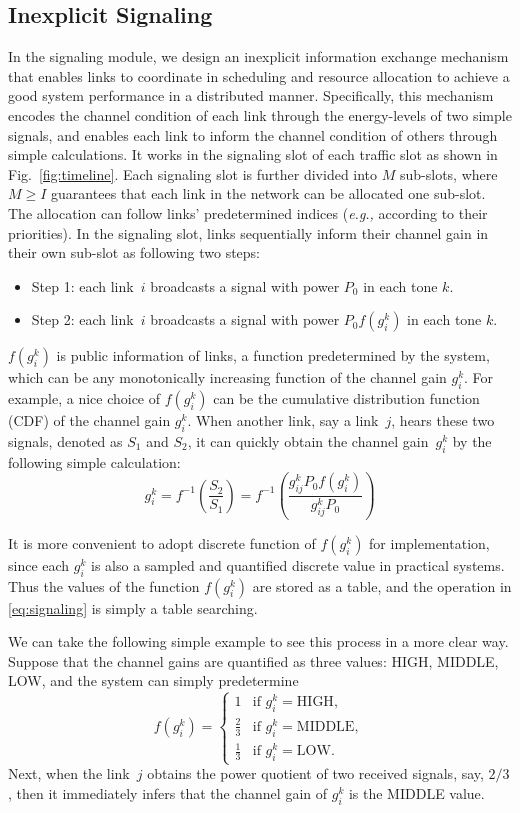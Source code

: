\documentclass[conference]{IEEEtran}
\newcommand{\eg}{\emph{e.g., }}
\begin{document}
\subsection{Inexplicit Signaling}
\label{sec:signaling}
In the signaling module, we design an inexplicit information exchange mechanism that enables links to coordinate in scheduling and resource allocation to achieve a good system performance in a distributed manner.
Specifically, this mechanism encodes the channel condition of each link through the energy-levels of two simple signals, and enables each link to inform the channel condition of others through simple calculations. It works in the signaling slot of each traffic slot as shown in Fig.~\ref{fig:timeline}. Each signaling slot is further divided into $M$ sub-slots, where $M\ge I$ guarantees that each link in the network can be allocated one sub-slot. The allocation can follow links' predetermined indices (\eg according to their priorities).
In the signaling slot, links sequentially inform their channel gain in their own sub-slot as following two steps:
\begin{itemize}
    \item Step 1: each link~$i$ broadcasts a signal with power $P_0$ in each tone $k$.
	 \item Step 2: each link~$i$ broadcasts a signal with power $P_0 f(g_i^k)$ in each tone $k$.
\end{itemize}
$f(g_i^k)$ is public information of links, a function predetermined by the system, which can be any monotonically increasing function of the channel gain $g_i^k$. For example, a nice choice of $f(g_i^k)$ can be the cumulative distribution function (CDF) of the channel gain $g_i^k$.
When another link, say a link~$j$, hears these two signals, denoted as $S_1$ and $S_2$,  it can quickly obtain the channel gain~$g_i^k$ by the following simple calculation:
\begin{equation}
\label{eq:signaling}
    g_i^k = f^{-1}\left(\frac{S_2}{S_1}\right)= f^{-1}\left(\frac{g_{ij}^kP_0 f(g_i^k)}{g_{ij}^kP_0 }\right)
\end{equation}

It is more convenient to adopt discrete function of $f(g_i^k)$ for implementation, since each $g_i^k$ is also a sampled and quantified discrete value in practical systems. Thus the values of the function $f(g_i^k)$ are stored as a table, and the operation in \eqref{eq:signaling} is simply a table searching.

We can take the following simple example to see this process in a more clear way. Suppose that the channel gains are quantified as three values: HIGH, MIDDLE, LOW, and the system can simply predetermine
\begin{equation}
    f(g_i^k)=
\begin{cases}
1 & \text{if }g_i^k=\text{HIGH},\\
\frac{2}{3}& \text{if } g_i^k=\text{MIDDLE},\\
\frac{1}{3}& \text{if } g_i^k=\text{LOW}.
\end{cases}
\end{equation}
Next, when the link~$j$ obtains the power quotient of two received signals, say, $2/3$, then it immediately infers that the channel gain of $g_i^k$ is the MIDDLE value.
\end{document}
